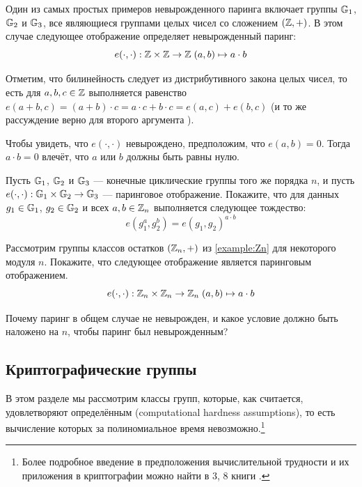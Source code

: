 \begin{example}
\label{example:integer_addition_pairing}
Один из самых простых примеров невырожденного паринга включает группы $\mathbb{G}_1$, $\mathbb{G}_2$ и $\mathbb{G}_3$, все являющиеся группами целых чисел со сложением $(\mathbb{Z},+)$. В этом случае следующее отображение определяет невырожденный паринг:
\begin{equation}
e(\cdot,\cdot): \mathbb{Z} \times \mathbb{Z} \to \mathbb{Z} \; (a,b)\mapsto a\cdot b
\end{equation}

Отметим, что билинейность следует из дистрибутивного закона целых чисел, то есть для $a,b,c\in \mathbb{Z}$ выполняется равенство $e(a+b,c)=(a+b)\cdot c = a\cdot c + b\cdot c = e(a,c)+ e(b,c)$ (и то же рассуждение верно для второго аргумента ).

Чтобы увидеть, что $e(\cdot,\cdot)$ невырождено, предположим, что $e(a,b)=0$. Тогда $a\cdot b =0$ влечёт, что $a$ или $b$ должны быть равны нулю.
\end{example}
\begin{exercise}
\label{ex:pairing-arithmetics} Пусть $\mathbb{G}_1$, $\mathbb{G}_2$ и $\mathbb{G}_3$ — конечные циклические группы того же порядка $n$, и пусть $e(\cdot,\cdot): \mathbb{G}_1 \times \mathbb{G}_2 \to \mathbb{G}_3$ — паринговое отображение. Покажите, что для данных $g_1\in \mathbb{G}_1$, $g_2\in \mathbb{G}_2$ и всех $a,b\in \mathbb{Z}_n$ выполняется следующее тождество:
\begin{equation}
e(g_1^a, g_2^b) = e(g_1,g_2)^{a\cdot b}
\end{equation}
\end{exercise}
\begin{exercise} Рассмотрим группы классов остатков $(\mathbb{Z}_n,+)$ из \examplename{} \ref{example:Zn} для некоторого модуля $n$. Покажите, что следующее отображение является паринговым отображением. 
\begin{equation}
e(\cdot,\cdot): \mathbb{Z}_n \times \mathbb{Z}_n \to \mathbb{Z}_n \; (a,b)\mapsto a\cdot b
\end{equation}

Почему паринг в общем случае не невырожден, и какое условие должно быть наложено на $n$, чтобы паринг был невырожденным?
\end{exercise}

\subsection{Криптографические группы}
\label{crypto_groups} В этом разделе мы рассмотрим классы групп, которые, как считается, удовлетворяют определённым  (computational hardness assumptions), то есть вычисление которых за полиномиальное время невозможно.\footnote{Более подробное введение в предположения вычислительной трудности и их приложения в криптографии можно найти в \chaptname{} 3, \secname{} 8 книги \cite{katz-2007}.}

